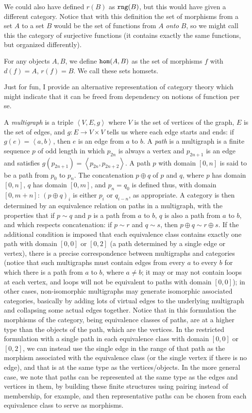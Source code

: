 \documentclass[12pt]{book}
\begin{document}
We could also have defined $r(B)$ as ${\tt rng}(B)$, but this would have given a different category.  Notice that with this definition the set of morphisms from a set $A$ to a set $B$ would be the set of functions from $A$ {\em onto\/} $B$, so we might call this the category of surjective functions (it contains exactly the same functions, but organized differently).

For any objects $A, B$, we define ${\tt hom}(A,B)$ as the set of morphisms $f$ with $d(f)=A$, $r(f)=B$.  We call these sets homsets.

Just for fun, I provide an alternative representation of category theory which might indicate that it can be freed from dependency on notions of function per se.

A {\em multigraph\/} is a triple  $\left<V,E,g\right>$ where $V$ is the set of vertices of the graph, $E$ is the set of edges, and $g:E \rightarrow V \times V$ tells us where each edge starts and ends:  if $g(e) = \left<a,b\right>$, then $e$ is an edge from $a$ to $b$.  A {\em path} is a multigraph is a finite sequence $p$ of odd length in which $p_{2n}$ is always a vertex and $p_{2n+1}$ is an edge and satisfies $g(p_{2n+1}) = \left<p_{2n},p_{2n+2}\right>$.  A path $p$ with domain $[0,n]$ is said to be a path from $p_0$ to $p_n$.  The concatenation $p \oplus q$ of $p$ and $q$, where $p$ has domain $[0,n]$, $q$ has domain $[0,m]$, and $p_n=q_0$ is defined thus, with domain $[0,m+n]$: $(p\oplus q)_i$ is either $p_i$ or $q_{i-n}$, as appropriate.  A category is then determined by an equivalence relation on paths in a multigraph, with the properties that if $p \sim q$ and $p$ is a path from $a$ to $b$, $q$ is also a path from $a$ to $b$, and which respects concatenation:  if $p \sim r$ and $q \sim s$, then $p \oplus q \sim r \oplus s$.
If the additional condition is imposed that each equivalence class contains exactly one path with domain $[0,0]$ or $[0,2]$ (a path determined by a single edge or vertex), there is a precise correspondence between multigraphs and categories (notice that such multigraphs must contain edges from every $a$ to every $b$ for which there is a path from $a$ to $b$,  where $a \neq b$; it may or may not contain loops at each vertex, and loops will not be equivalent to paths with domain $[0,0]$); in other cases, non-isomorphic multigraphs may generate isomorphic associated categories, basically by adding lots of virtual edges to the underlying multigraph and collapsing some actual edges together.  Notice that in this formulation the morphisms of the category, being equivalence classes of paths, are at a higher type than the objects of the path, which are the vertices.
In the restricted formulation with a single path in each equivalence class with domain $[0,0]$ or $[0,2]$, we can instead use the single edge in the range
of that path as the morphism associated with the equivalence class (or the single vertex if there is no edge), and that is at the same type as the vertices/objects.  In the more general case, we note that paths can be represented at the same type as the edges and vertices in them, by building these finite structures using pairing instead of membership, for example, and then representative paths can be chosen from each equivalence class to serve as morphisms.
\end{document}
